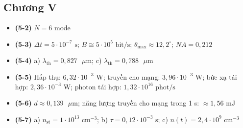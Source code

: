 \documentclass[11pt,a4paper]{article}
\begin{document}
\subsection*{Chương V}
\begin{itemize}[itemsep=0.5pt, topsep=1pt, parsep=0pt, leftmargin=1.8em]
  \item \textbf{(5-2)} $N = 6\text{ mode}$
  \item \textbf{(5-3)} $\Delta t = 5 \cdot 10^{-7}\text{ s}$; $B \cong 5 \cdot 10^5\text{ bit/s}$; $\theta_{\max} \approx 12{,}2^\circ$; $NA = 0{,}212$
  \item \textbf{(5-4)} a) $\lambda_{\text{th}} = 0{,}827\text{ }\mu\text{m}$; c) $\lambda_{\text{th}} = 0{,}788\text{ }\mu\text{m}$
  \item \textbf{(5-5)} Hấp thụ: $6{,}32 \cdot 10^{-3}\text{ W}$; truyền cho mạng: $3{,}96 \cdot 10^{-3}\text{ W}$; bức xạ tái hợp: $2{,}36 \cdot 10^{-3}\text{ W}$; photon tái hợp: $1{,}32 \cdot 10^{16}\text{ phot/s}$
  \item \textbf{(5-6)} $d \approx 0{,}139\text{ }\mu\text{m}$; năng lượng truyền cho mạng trong 1 s: $\approx 1{,}56\text{ mJ}$
  \item \textbf{(5-7)} a) $n_{\text{st}} = 1 \cdot 10^{13}\text{ cm}^{-3}$; b) $\tau = 0{,}12 \cdot 10^{-3}\text{ s}$; c) $n(t) = 2{,}4 \cdot 10^9\text{ cm}^{-3}$
\end{itemize}
\endgroup
\end{document}
